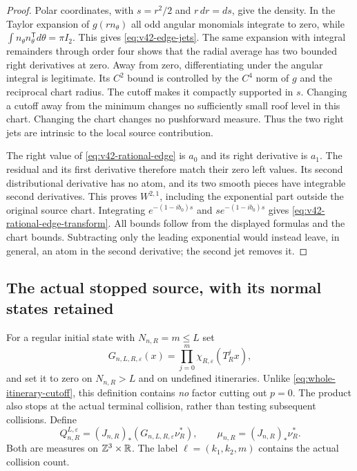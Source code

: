 \begin{proof}
Polar coordinates, with $s=r^2/2$ and $r\,dr=ds$, give the density.
In the Taylor expansion of $g(rn_\theta)$ all odd angular monomials
integrate to zero, while
$\int n_\theta n_\theta^{\mathsf T}d\theta=\pi I_2$.
This gives \eqref{eq:v42-edge-jets}. The same expansion with integral
remainders through order four shows that the radial average has two
bounded right derivatives at zero. Away from zero, differentiating
under the angular integral is legitimate. Its $C^2$ bound is controlled
by the $C^4$ norm of $g$ and the reciprocal chart radius. The cutoff
makes it compactly supported in $s$. Changing a cutoff away from the
minimum changes no sufficiently small roof level in this chart.
Changing the chart changes no pushforward measure. Thus the two right
jets are intrinsic to the local source contribution.

The right value of \eqref{eq:v42-rational-edge} is $a_0$ and its right
derivative is $a_1$. The residual and its first derivative therefore
match their zero left values. Its second distributional derivative
has no atom, and its two smooth pieces have integrable second
derivatives. This proves $W^{2,1}$, including the exponential part
outside the original source chart. Integrating $e^{-(1-ib_0)s}$ and
$s e^{-(1-ib_0)s}$ gives \eqref{eq:v42-rational-edge-transform}.
All bounds follow from the displayed formulas and the chart bounds.
Subtracting only the leading exponential would instead leave, in
general, an atom in the second derivative; the second jet removes it.
\end{proof}

\subsection{The actual stopped source, with its normal states retained}
For a regular initial state with $N_{n,R}=m\le L$ set
\begin{equation}\label{eq:v42-stopped-guard}
 G_{n,L,R,\varepsilon}(x)=\prod_{j=0}^{m}
                         \chi_{R,\varepsilon}(T_R^jx),
\end{equation}
and set it to zero on $N_{n,R}>L$ and on undefined itineraries.
Unlike \eqref{eq:whole-itinerary-cutoff}, this definition contains
\emph{no} factor cutting out $p=0$. The product also stops at the
actual terminal collision, rather than testing subsequent collisions.
Define
\[
 Q_{n,R}^{L,\varepsilon}=(J_{n,R})_*
                   (G_{n,L,R,\varepsilon}\nu_R^*),\qquad
 \mu_{n,R}=(J_{n,R})_*\nu_R^*.
\]
Both are measures on $\mathbb Z^3\times\mathbb R$. The label
$\ell=(k_1,k_2,m)$ contains the actual collision count.

